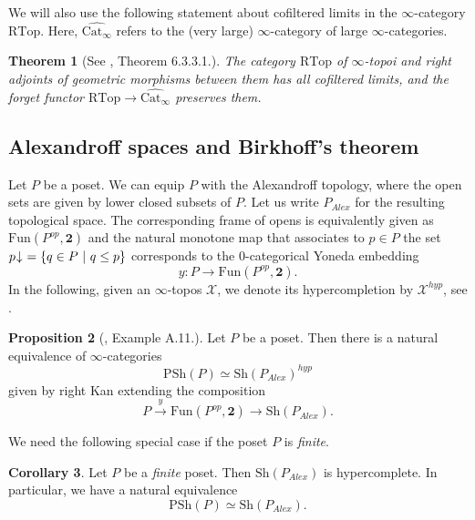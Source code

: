 \documentclass[10pt]{amsart}
\newtheorem{theorem}{Theorem}[section]
\theoremstyle{definition}
\newtheorem{proposition}[theorem]{Proposition}
\newtheorem{corollary}[theorem]{Corollary}
\begin{document}
We will also use the following statement about cofiltered limits in the $\infty$-category $\mathrm{RTop}$. Here, $\widehat{\mathrm{Cat}_\infty}$ refers to the (very large) $\infty$-category of large $\infty$-categories.

\begin{theorem}[See \cite{luriehtt}, Theorem 6.3.3.1.] \label{cofilteredlimitstopoi}
The category $\mathrm{RTop}$ of $\infty$-topoi and right adjoints of geometric morphisms between them has all cofiltered limits, and the forget functor $\mathrm{RTop} \rightarrow \widehat{\mathrm{Cat}_\infty}$ preserves them.
\end{theorem}


\subsection{Alexandroff spaces and Birkhoff's theorem} \label{alexandroff}

Let $P$ be a poset. We can equip $P$ with the Alexandroff topology, where the open sets are given by lower closed subsets of $P$. Let us write $P_{Alex}$ for the resulting topological space. The corresponding frame of opens is equivalently given as $\mathrm{Fun}(P^{op},\mathbf{2})$ and the natural monotone map that associates to $p \in P$ the set $p\hspace{-0.5ex}\downarrow ~= \{ q \in P ~|~ q \leq p \}$ corresponds to the $0$-categorical Yoneda embedding
$$y : P \rightarrow  \mathrm{Fun}(P^{op},\mathbf{2}).$$
In the following, given an $\infty$-topos $\mathcal{X}$, we denote its hypercompletion by $\mathcal{X}^{hyp}$, see \cite[Section 6.5.2]{luriehtt}.

\begin{proposition}[\cite{Aoki_2023}, Example A.11.]
Let $P$ be a poset. Then there is a natural equivalence of $\infty$-categories
$$ \mathrm{PSh}(P) \simeq \mathrm{Sh}( P_{Alex} )^{hyp}$$
given by right Kan extending the composition
$$ P \xrightarrow{y} \mathrm{Fun}(P^{op},\mathbf{2}) \rightarrow \mathrm{Sh}( P_{Alex} ).$$
\end{proposition}

We need the following special case if the poset $P$ is \emph{finite}.

\begin{corollary} \label{finiteposet}
Let $P$ be a \emph{finite} poset. Then $\mathrm{Sh}( P_{Alex} )$ is hypercomplete. In particular, we have a natural equivalence
$$ \mathrm{PSh}(P) \simeq \mathrm{Sh}( P_{Alex} ).$$
\end{corollary}
\end{document}
